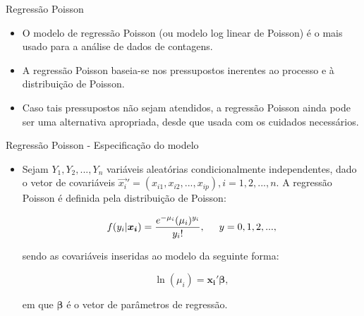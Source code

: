 \documentclass[10pt, aspectratio=169]{beamer}
\begin{document}


\begin{frame}{Regressão Poisson} 

\begin{itemize}
    \item O modelo de regressão Poisson (ou modelo log linear de Poisson) é o mais usado para a análise de dados de contagens.
    
    \vspace{0,5cm}
    
    \item A regressão Poisson baseia-se nos pressupostos inerentes ao processo e à distribuição de Poisson.
    
    \vspace{0,5cm}
    
    \item Caso tais pressupostos não sejam atendidos, a regressão Poisson ainda pode ser uma alternativa apropriada, desde que usada com os cuidados necessários.
    
\end{itemize}

\end{frame}



\begin{frame}{Regressão Poisson - Especificação do modelo} 

\begin{itemize}
    \item Sejam $Y_{1},Y_{2},...,Y_{n}$ variáveis aleatórias condicionalmente independentes, dado o vetor de covariáveis ${\vec{x_{i}}}'=(x_{i1},x_{i2},...,x_{ip}), i=1,2,...,n$. A regressão Poisson é definida pela distribuição de Poisson:


$$
   f(y_{i}|\boldsymbol{x_{i}})=\frac{e^{-\mu_{i}}(\mu_{i})^{y_{i}}}{y_{i}!},\hspace{5mm}y=0,1,2,...,
$$

\vspace{0,2cm}
 
sendo as covariáveis inseridas ao modelo da seguinte forma:

$$
\ln(\mu _{i})=\boldsymbol{x_{i}'} \boldsymbol{\beta},
$$

\vspace{0,2cm}
 
em que ${\boldsymbol{\beta }}$ é o vetor de parâmetros de regressão.
 

\end{itemize}

\end{frame}
\end{document}
